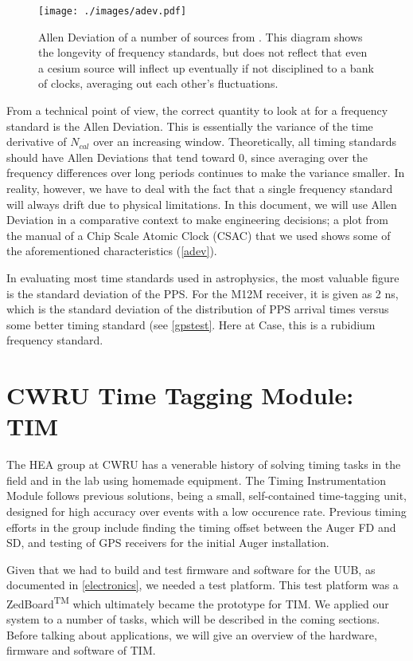 \begin{figure}[h!]
\centering
\texttt{[image: ./images/adev.pdf]}
\caption[CSAC Allen Deviation]{Allen Deviation of a number of sources from \textcite{csac}. This diagram shows the longevity of frequency standards, but does not reflect that even a cesium source will inflect up eventually if not disciplined to a bank of clocks, averaging out each other's fluctuations.}
\label{adev}
\end{figure}

From a technical point of view, the correct quantity to look at for a frequency standard is the Allen Deviation. This is essentially the variance of the time derivative of $N_{cal}$ over an increasing window. Theoretically, all timing standards should have Allen Deviations that tend toward 0, since averaging over the frequency differences over long periods continues to make the variance smaller. In reality, however, we have to deal with the fact that a single frequency standard will always drift due to physical limitations. In this document, we will use Allen Deviation in a comparative context to make engineering decisions; a plot from the manual of a Chip Scale Atomic Clock (CSAC) that we used shows some of the aforementioned characteristics (\autoref{adev}). 

In evaluating most time standards used in astrophysics, the most valuable figure is the standard deviation of the PPS. For the M12M receiver, it is given as 2 ns, which is the standard deviation of the distribution of PPS arrival times versus some better timing standard (see \autoref{gpstest}. Here at Case, this is a rubidium frequency standard.


\section{CWRU Time Tagging Module: TIM}
\label{tim}
The HEA group at CWRU has a venerable history of solving timing tasks in the field and in the lab using homemade equipment. The Timing Instrumentation Module follows previous solutions, being a small, self-contained time-tagging unit, designed for high accuracy over events with a low occurence rate. Previous timing efforts in the group include finding the timing offset between the Auger FD and SD, and testing of GPS receivers for the initial Auger installation. 

Given that we had to build and test firmware and software for the UUB, as documented in \autoref{electronics}, we needed a test platform. This test platform was a ZedBoard\textsuperscript{TM} which ultimately became the prototype for TIM. We applied our system to a number of tasks, which will be described in the coming sections. Before talking about applications, we will give an overview of the hardware, firmware and software of TIM.


